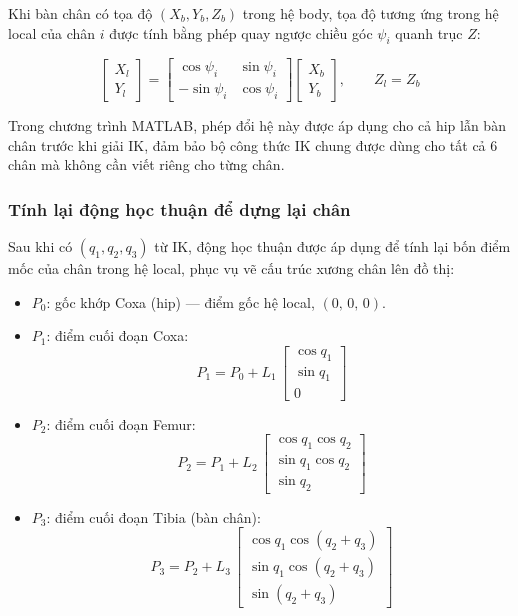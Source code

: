 Khi bàn chân có tọa độ $(X_b, Y_b, Z_b)$ trong hệ body, tọa độ tương ứng trong hệ local của chân $i$ được tính bằng phép quay ngược chiều góc $\psi_i$ quanh trục $Z$:

\begin{equation}
    \begin{bmatrix} X_l \\ Y_l \end{bmatrix}
    =
    \begin{bmatrix} \cos\psi_i & \sin\psi_i \\ -\sin\psi_i & \cos\psi_i \end{bmatrix}
    \begin{bmatrix} X_b \\ Y_b \end{bmatrix},
    \qquad Z_l = Z_b
\end{equation}

Trong chương trình MATLAB, phép đổi hệ này được áp dụng cho cả hip lẫn bàn chân trước khi giải IK, đảm bảo bộ công thức IK chung được dùng cho tất cả 6 chân mà không cần viết riêng cho từng chân.


\subsubsection{Tính lại động học thuận để dựng lại chân}

\hspace{0.5cm} Sau khi có $(q_1, q_2, q_3)$ từ IK, động học thuận được áp dụng để tính lại bốn điểm mốc của chân trong hệ local, phục vụ vẽ cấu trúc xương chân lên đồ thị:

\begin{itemize}
    \item $P_0$: gốc khớp Coxa (hip) — điểm gốc hệ local, $(0,\, 0,\, 0)$.
    \item $P_1$: điểm cuối đoạn Coxa:
        \begin{equation}
            P_1 = P_0 + L_1\,\begin{bmatrix}\cos q_1 \\ \sin q_1 \\ 0\end{bmatrix}
        \end{equation}
    \item $P_2$: điểm cuối đoạn Femur:
        \begin{equation}
            P_2 = P_1 + L_2\,\begin{bmatrix}\cos q_1 \cos q_2 \\ \sin q_1 \cos q_2 \\ \sin q_2\end{bmatrix}
        \end{equation}
    \item $P_3$: điểm cuối đoạn Tibia (bàn chân):
        \begin{equation}
            P_3 = P_2 + L_3\,\begin{bmatrix}\cos q_1 \cos(q_2+q_3) \\ \sin q_1 \cos(q_2+q_3) \\ \sin(q_2+q_3)\end{bmatrix}
        \end{equation}
\end{itemize}

